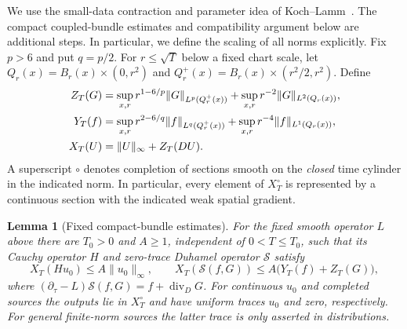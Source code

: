 \documentclass[11pt]{article}
\numberwithin{equation}{section}
\newtheorem{lemma}[theorem]{Lemma}
\theoremstyle{definition}
\theoremstyle{remark}
\begin{document}
We use the small-data contraction and parameter idea of
Koch--Lamm~\cite[Sections 2--4 of the inspected preprint]{KochLamm2015}.
The compact coupled-bundle estimates and compatibility argument
below are additional steps. In particular, we define the scaling
of all norms explicitly. Fix $p>6$ and put $q=p/2$.
For $r\le\sqrt T$ below a fixed chart scale, let
$Q_r(x)=B_r(x)\times(0,r^2)$ and
$Q_r^+(x)=B_r(x)\times(r^2/2,r^2)$. Define
\begin{align}
 Z_T(G)&=\sup_{x,r}r^{1-6/p}\|G\|_{L^p(Q_r^+(x))}
             +\sup_{x,r}r^{-2}\|G\|_{L^2(Q_r(x))},\notag\\
 Y_T(f)&=\sup_{x,r}r^{2-6/q}\|f\|_{L^q(Q_r^+(x))}
             +\sup_{x,r}r^{-4}\|f\|_{L^1(Q_r(x))},\label{eq:rough-norms}\\
 X_T(U)&=\|U\|_\infty+Z_T(DU).\notag
\end{align}
A superscript $\circ$ denotes completion of sections smooth on
the \emph{closed} time cylinder in the indicated norm.
In particular, every element of $X_T^\circ$ is represented by
a continuous section with the indicated weak spatial gradient.

\begin{lemma}[Fixed compact-bundle estimates]\label{lem:rough-linear}
For the fixed smooth operator $L$ above there are $T_0>0$ and
$A\ge1$, independent of $0<T\le T_0$, such that its Cauchy
operator $H$ and zero-trace Duhamel operator $\mathcal S$ satisfy
\[
 X_T(Hu_0)\le A\|u_0\|_\infty,\qquad
 X_T(\mathcal S(f,G))\le A\bigl(Y_T(f)+Z_T(G)\bigr),
\]
where $(\partial_\tau-L)\mathcal S(f,G)=f+\operatorname{div}_DG$.
For continuous $u_0$ and completed sources the outputs lie in
$X_T^\circ$ and have uniform traces $u_0$ and zero, respectively.
For general finite-norm sources the latter trace is only asserted
in distributions.
\end{lemma}
\end{document}
